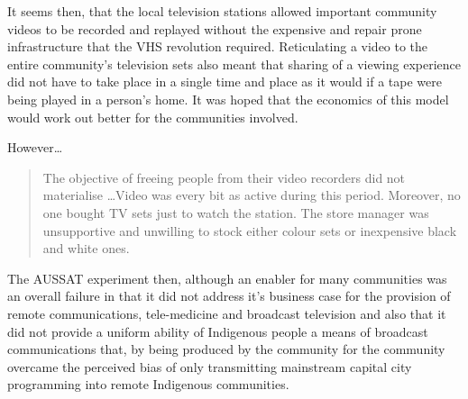 It seems then, that the local television stations allowed important community videos to be recorded and replayed without the expensive and repair prone infrastructure that the VHS revolution required. Reticulating a video to the entire community's television sets also meant that sharing of a viewing experience did not have to take place in a single time and place as it would if a tape were being played in a person's home. It was hoped that the economics of this model would work out better for the communities involved.

However\ldots
\begin{quotation}
The objective of freeing people from their video recorders did not materialise \ldots Video was every bit as active during this period. Moreover, no one bought TV sets just to watch the station. The store manager was unsupportive and unwilling to stock either colour sets or inexpensive black and white ones\cite[p.77]{RefWorks:25}.
\end{quotation}

The AUSSAT experiment then, although an enabler for many communities was an overall failure in that it did not address it's business case for the provision of remote communications, tele-medicine and broadcast television and also that it did not provide a uniform ability of Indigenous people a means of broadcast communications that, by being produced by the community for the community overcame the perceived bias of only transmitting mainstream capital city programming into remote Indigenous communities. 

